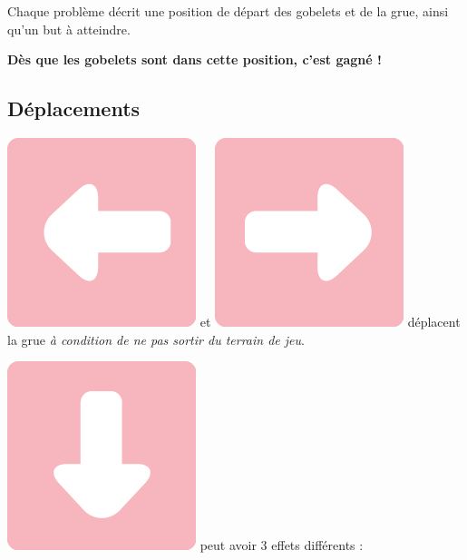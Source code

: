 \documentclass[a4paper]{article}
\begin{document}
\begin{minipage}{6cm}
Chaque problème décrit une position de
départ des gobelets et de la grue, ainsi qu'un but à atteindre.

\textbf{Dès que les gobelets sont dans
  cette position, c'est gagné !}

\vspace{-0.2cm}


\subsection*{Déplacements}
\vspace{-0.2cm}

\includegraphics[height=\baselineskip]{left} et 
\includegraphics[height=\baselineskip]{right} d\'eplacent la grue
\emph{à condition de ne pas sortir du terrain de jeu}.
%

\includegraphics[height=\baselineskip]{down} peut avoir 3
effets différents :


\end{minipage}
\end{document}
